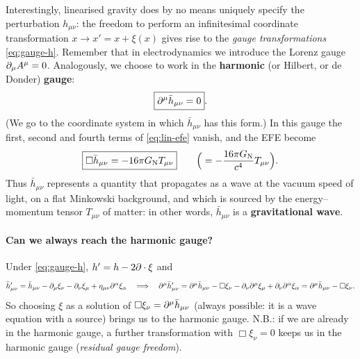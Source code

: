 Interestingly, linearised gravity does by no means uniquely specify the perturbation $h_{\mu\nu}$: the freedom to perform an infinitesimal coordinate transformation $x\to x'=x+\xi(x)$ gives rise to the \emph{gauge transformations} \eqref{eq:gauge-h}. Remember that in electrodynamics we introduce the Lorenz gauge $\partial_\mu A^\mu=0$. Analogously, we choose to work in the \textbf{harmonic} (or Hilbert, or de Donder) \textbf{gauge}:
\begin{equation}
  \boxed{\partial^\mu\bar h_{\mu\nu}=0}.
\end{equation}
(We go to the coordinate system in which $\bar h_{\mu\nu}$ has this form.) In this gauge the first, second and fourth terms of \eqref{eq:lin-efe} vanish, and the EFE become
\begin{equation}
  \boxed{\square\bar h_{\mu\nu}=-16\pi G_{\mathrm N} T_{\mu\nu}}\qquad\Big(=-\frac{16\pi G_{\mathrm N}}{c^4}T_{\mu\nu}\Big).
\end{equation}
Thus $\bar h_{\mu\nu}$ represents a quantity that propagates as a wave at the vacuum speed of light, on a flat Minkowski background, and which is sourced by the energy--momentum tensor $T_{\mu\nu}$ of matter: in other words, $\bar h_{\mu\nu}$ is a \textbf{gravitational wave}.

\paragraph{Can we always reach the harmonic gauge?} Under \eqref{eq:gauge-h}, $h'=h-2\partial\cdot\xi$ and
\[
  \bar h'_{\mu\nu}=\bar h_{\mu\nu}-\partial_\mu\xi_\nu-\partial_\nu\xi_\mu+\eta_{\mu\nu}\partial^\alpha\xi_\alpha
  \quad\Longrightarrow\quad\partial^\mu\bar h'_{\mu\nu}=\partial^\mu\bar h_{\mu\nu}-\square\xi_\nu-\partial_\nu\partial^\mu\xi_\mu+\partial_\nu\partial^\alpha\xi_\alpha=\partial^\mu\bar h_{\mu\nu}-\square\xi_\nu .
\]
So choosing $\xi$ as a solution of $\square\xi_\nu=\partial^\mu\bar h_{\mu\nu}$ (always possible: it is a wave equation with a source) brings us to the harmonic gauge. N.B.: if we are already in the harmonic gauge, a further transformation with $\Box\xi_\nu=0$ keeps us in the harmonic gauge (\emph{residual gauge freedom}).

